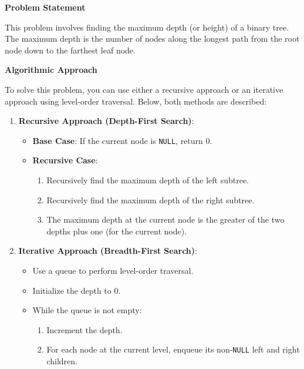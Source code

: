 

\textbf{Problem Statement}

This problem involves finding the maximum depth (or height) of a binary tree. The maximum depth is the number of nodes along the longest path from the root node down to the farthest leaf node.

\textbf{Algorithmic Approach}

To solve this problem, you can use either a recursive approach or an iterative approach using level-order traversal. Below, both methods are described:

\begin{enumerate}
    \item \textbf{Recursive Approach (Depth-First Search)}:
    \begin{itemize}
        \item \textbf{Base Case}: If the current node is \texttt{NULL}, return 0.
        \item \textbf{Recursive Case}: 
        \begin{enumerate}
            \item Recursively find the maximum depth of the left subtree.
            \item Recursively find the maximum depth of the right subtree.
            \item The maximum depth at the current node is the greater of the two depths plus one (for the current node).
        \end{enumerate}
    \end{itemize}
    
    \item \textbf{Iterative Approach (Breadth-First Search)}:
    \begin{itemize}
        \item Use a queue to perform level-order traversal.
        \item Initialize the depth to 0.
        \item While the queue is not empty:
        \begin{enumerate}
            \item Increment the depth.
            \item For each node at the current level, enqueue its non-\texttt{NULL} left and right children.
        \end{enumerate}
    \end{itemize}
\end{enumerate}

